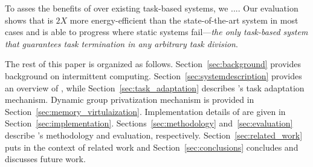  To asses the benefits of \sys over existing task-based systems, we .... 
Our evaluation shows that \sys is $2X$ more energy-efficient than the state-of-the-art system in most cases and is able to progress where static systems fail---\emph{the only task-based system that guarantees task termination in any arbitrary task division}.
 

The rest of this paper is organized as follows. Section~\ref{sec:background} provides background on intermittent computing.
Section~\ref{sec:systemdescription} provides an overview of \sys, while
Section~\ref{sec:task_adaptation} describes \sys's task adaptation mechanism. Dynamic group privatization mechanism is provided in Section~\ref{sec:memory_virtulaization}. Implementation details of \sys are given in Section~\ref{sec:implementation}. Sections~\ref{sec:methodology} and~\ref{sec:evaluation} describe \sys's methodology and evaluation, respectively. Section~\ref{sec:related_work} puts \sys in the
context of related work and Section~\ref{sec:conclusions} concludes and discusses
future work.
